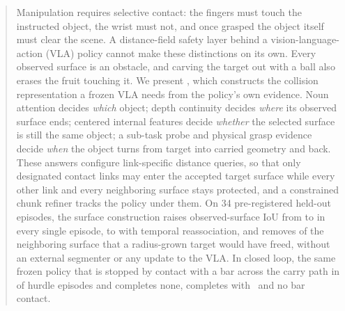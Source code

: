 \begin{abstract}
Manipulation requires selective contact: the fingers must touch the instructed object, the wrist must not, and once grasped the object itself must clear the scene. A distance-field safety layer behind a vision-language-action (VLA) policy cannot make these distinctions on its own. Every observed surface is an obstacle, and carving the target out with a ball also erases the fruit touching it. We present \sys, which constructs the collision representation a frozen VLA needs from the policy's own evidence. Noun attention decides \emph{which} object; depth continuity decides \emph{where} its observed surface ends; centered internal features decide \emph{whether} the selected surface is still the same object; a sub-task probe and physical grasp evidence decide \emph{when} the object turns from target into carried geometry and back. These answers configure link-specific distance queries, so that only designated contact links may enter the accepted target surface while every other link and every neighboring surface stays protected, and a constrained chunk refiner tracks the policy under them. On 34 pre-registered held-out episodes, the surface construction raises observed-surface IoU from  to  in every single episode, to  with temporal reassociation, and removes  of the neighboring surface that a radius-grown target would have freed, without an external segmenter or any update to the VLA. In closed loop, the same frozen policy that is stopped by contact with a bar across the carry path in  of  hurdle episodes and completes none, completes  with \sys\ and no bar contact. 
\end{abstract}
